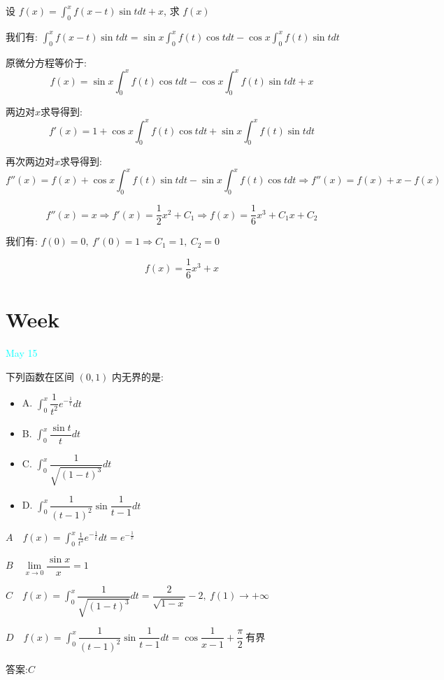 \begin{example}[][Exam: 31.2.14]
	设 $f(x)=\int_{0}^{x}f(x-t)\sin tdt+x$, 求 $f(x)$
\end{example}

\begin{solution}
	
	我们有: $\int_{0}^{x}f(x-t)\sin tdt=\sin x\int_{0}^{x}f(t)\cos tdt-\cos x\int_{0}^{x}f(t)\sin tdt$
	
	原微分方程等价于: 
	$$f(x)=\sin x\int_{0}^{x}f(t)\cos tdt-\cos x\int_{0}^{x}f(t)\sin tdt+x$$
	
	两边对$x$求导得到: 
	$$f'(x)=1+\cos x\int_{0}^{x}f(t)\cos tdt+\sin x\int_{0}^{x}f(t)\sin tdt$$
	
	再次两边对$x$求导得到: 
	$$f''(x)=f(x)+\cos x\int_{0}^{x}f(t)\sin tdt-\sin x\int_{0}^{x}f(t)\cos tdt\Rightarrow f''(x)=f(x)+x-f(x)$$
	
	$$f''(x)=x\Rightarrow f'(x)=\frac{1}{2}x^2+C_{1}\Rightarrow f(x)=\frac{1}{6}x^3+C_{1}x+C_{2}$$
	
	我们有: $f(0)=0,\ f'(0)=1\Rightarrow C_{1}=1,\ C_{2}=0$
	
	$$f(x)=\frac{1}{6}x^3+x$$
\end{solution}


\section{Week }
\textcolor{cyan}{May 15}

\begin{example}[][Exam: 31.3.1]
	下列函数在区间 $(0,1)$ 内无界的是: 
\begin{itemize}
	\item A. $\int_{0}^{x}\dfrac{1}{t^2}e^{-\frac{1}{t}}dt$ 
	\item B. $\int_{0}^{x}\dfrac{\sin t}{t}dt$ 
	\item C. $\int_{0}^{x}\dfrac{1}{\sqrt{(1-t)^3}}dt$ 
	\item D. $\int_{0}^{x}\dfrac{1}{(t-1)^2}\sin\dfrac{1}{t-1}dt$ 
\end{itemize}
\end{example}

\begin{solution}
	
	$A \quad f(x)=\int_{0}^{x}\frac{1}{t^2}e^{-\frac{1}{t}}dt=e^{-\frac{1}{x}}$
	
	$B \quad \lim\limits_{x\to 0}\dfrac{\sin x}{x}=1$
	
	$C \quad f(x)=\int_{0}^{x}\dfrac{1}{\sqrt{(1-t)^3}}dt=\dfrac{2}{\sqrt{1-x}}-2, \ f(1)\to+\infty$
	
	$D \quad f(x)=\int_{0}^{x}\dfrac{1}{(t-1)^2}\sin\dfrac{1}{t-1}dt=\cos \dfrac{1}{x-1}+\dfrac{\pi}{2}\  \text{有界}$
	
	答案:$C$
\end{solution}


